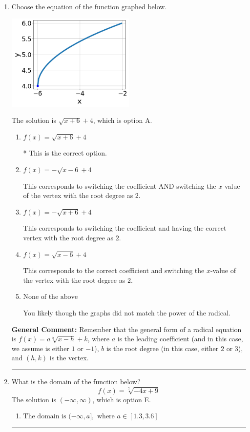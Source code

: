 \documentclass{extbook}[14pt]
\newcommand{\litem}[1]{\item #1

\rule{\textwidth}{0.4pt}}
\begin{document}
\begin{enumerate}\litem{
Choose the equation of the function graphed below.

\begin{center}
    \includegraphics[width=0.5\textwidth]{../Figures/radicalGraphToEquationB.png}
\end{center}


The solution is \( \sqrt{x + 6} + 4 \), which is option A.\begin{enumerate}[label=\Alph*.]
\item \( f(x) = \sqrt{x + 6} + 4 \)

* This is the correct option.
\item \( f(x) = - \sqrt{x - 6} + 4 \)

This corresponds to switching the coefficient AND switching the $x$-value of the vertex with the root degree as $2$.
\item \( f(x) = - \sqrt{x + 6} + 4 \)

This corresponds to switching the coefficient and having the correct vertex with the root degree as $2$.
\item \( f(x) = \sqrt{x - 6} + 4 \)

This corresponds to the correct coefficient and switching the $x$-value of the vertex with the root degree as $2$.
\item \( \text{None of the above} \)

You likely though the graphs did not match the power of the radical.
\end{enumerate}

\textbf{General Comment:} Remember that the general form of a radical equation is $ f(x) = a \sqrt[b]{x - h} + k$, where $a$ is the leading coefficient (and in this case, we assume is either $1$ or $-1$), $b$ is the root degree (in this case, either $2$ or $3$), and $(h, k)$ is the vertex.
}
\litem{
What is the domain of the function below?
\[ f(x) = \sqrt[7]{-4 x + 9} \]The solution is \( (-\infty, \infty) \), which is option E.\begin{enumerate}[label=\Alph*.]
\item \( \text{The domain is } (-\infty, a], \text{   where } a \in [1.3, 3.6] \)


\end{enumerate}}
\end{enumerate}
\end{document}
